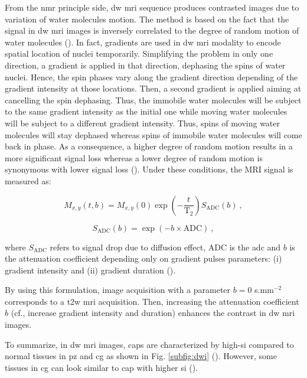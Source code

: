 \begin{enumerate}[leftmargin=*]
From the \ac{nmr} principle side, \ac{dw} \ac{mri} sequence produces contrasted images due to variation of water molecules motion. The method is based on the fact that the signal in \ac{dw} \ac{mri} images is inversely correlated to the degree of random motion of water molecules (\cite{Huisman2003}). In fact, gradients are used in \ac{dw} \ac{mri} modality to encode spatial location of nuclei temporarily. Simplifying the problem in only one direction, a gradient is applied in that direction, dephasing the spins of water nuclei. Hence, the spin phases vary along the gradient direction depending of the gradient intensity at those locations. Then, a second gradient is applied aiming at cancelling the spin dephasing. Thus, the immobile water molecules will be subject to the same gradient intensity as the initial one while moving water molecules will be subject to a different gradient intensity. Thus, spins of moving water molecules will stay dephased whereas spins of immobile water molecules will come back in phase. As a consequence, a higher degree of random motion results in a more significant signal loss whereas a lower degree of random motion is synonymous with lower signal loss (\cite{Huisman2003}). Under these conditions, the MRI signal is measured as:

\begin{equation}
	M_{x,y}\left(t,b\right) = M_{x,y}(0) \exp \left( - \frac{t}{\text{T}_2} \right) S_{\text{ADC}}(b) \ , 
	\label{eq:t2dif}
\end{equation}

\begin{equation}
	S_{\text{ADC}}(b) = \exp \left( -b \times \text{ADC} \right) \ ,
	\label{eq:dif}
\end{equation}

\noindent where $S_{\text{ADC}}$ refers to signal drop due to diffusion effect, $\text{ADC}$ is the \acl{adc} and $b$ is the attenuation coefficient depending only on gradient pulses parameters: (i) gradient intensity and (ii) gradient duration (\cite{LeBihan1986}).

By using this formulation, image acquisition with a parameter $b=0$ s.mm$^{-2}$ corresponds to a \ac{t2w} \ac{mri} acquisition. Then, increasing the attenuation coefficient $b$ (cf., increase gradient intensity and duration) enhances the contrast in \ac{dw} \ac{mri} images.

To summarize, in \ac{dw} \ac{mri} images, \acp{cap} are characterized by high-\ac{si} compared to normal tissues in \ac{pz} and \ac{cg} as shown in Fig. \ref{subfig:dwi} (\cite{Barentsz2012}). However, some tissues in \ac{cg} can look similar to \ac{cap} with higher \ac{si} (\cite{Barentsz2012}).


\end{enumerate}
